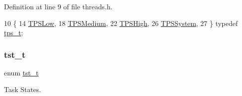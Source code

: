 Definition at line 9 of file threads.\+h.


\begin{DoxyCode}
10  \{
14     \hyperlink{a00065_a5ee504524d7b79ed81a1ed7b325dc9c6_a5ee504524d7b79ed81a1ed7b325dc9c6a9d68d2bd5bb4b7a813b53a3c6efb26a3}{TPSLow},
18     \hyperlink{a00065_a5ee504524d7b79ed81a1ed7b325dc9c6_a5ee504524d7b79ed81a1ed7b325dc9c6ab65c1c2b03accd655caa87db240a87db}{TPSMedium},
22     \hyperlink{a00065_a5ee504524d7b79ed81a1ed7b325dc9c6_a5ee504524d7b79ed81a1ed7b325dc9c6a99b1e5d2af2ea961d67a5d0f982fb0c2}{TPSHigh},
26     \hyperlink{a00065_a5ee504524d7b79ed81a1ed7b325dc9c6_a5ee504524d7b79ed81a1ed7b325dc9c6a557f7fd60ef979a8df84e7eea7de9f9b}{TPSSystem},
27 \} \textcolor{keyword}{typedef} \hyperlink{a00065_a5ee504524d7b79ed81a1ed7b325dc9c6_a5ee504524d7b79ed81a1ed7b325dc9c6}{tps\_t};
\end{DoxyCode}
\mbox{\label{a00065_a3895f03bb811310833570ff0b8a403d9_a3895f03bb811310833570ff0b8a403d9}} 
\subsubsection{\texorpdfstring{tst\+\_\+t}{tst\_t}}
{\footnotesize\ttfamily enum \hyperlink{a00065_a3895f03bb811310833570ff0b8a403d9_a3895f03bb811310833570ff0b8a403d9}{tst\+\_\+t}}



Task States. 

